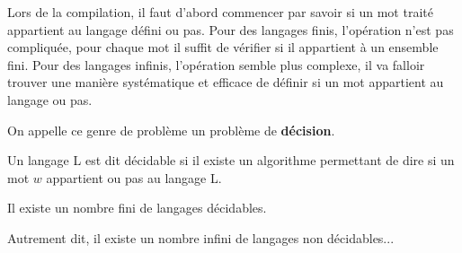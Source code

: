 Lors de la compilation, il faut d'abord commencer par savoir si un mot traité appartient au langage défini ou pas. 
Pour des langages finis, l'opération n'est pas compliquée, pour chaque mot il suffit de vérifier si il appartient à un ensemble fini. 
Pour des langages infinis, l'opération semble plus complexe, il va falloir trouver une manière systématique et efficace de 
définir si un mot appartient au langage ou pas. 

On appelle ce genre de problème un problème de \textbf{décision}. 

\begin{definition}
    Un langage L est dit décidable si il existe un algorithme permettant de dire si un mot $w$ appartient 
    ou pas au langage L. 
\end{definition}

\begin{theorem}
    Il existe un nombre fini de langages décidables. 
\end{theorem}

Autrement dit, il existe un nombre infini de langages non décidables...

